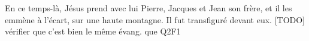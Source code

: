 En ce temps-là, Jésus prend avec lui Pierre, Jacques et Jean son frère,
	et il les emmène à l’écart, sur une haute montagne.
Il fut transfiguré devant eux.
[TODO] vérifier que c'est bien le même évang. que Q2F1